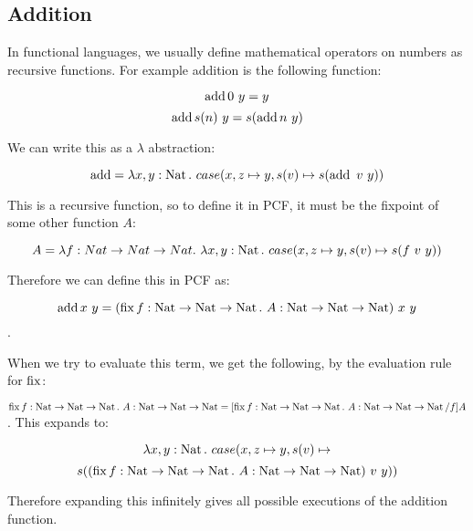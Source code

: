 \subsection{Addition}

In functional languages, we usually define mathematical operators on numbers as recursive functions. For example addition is the following function:

\[\operatorname{add}  0 \ y = y \]
\[\operatorname{add}  s(n) \ y = s(\operatorname{add}  n \ y)\]

We can write this as a $\lambda$ abstraction:

\[ \operatorname{add} = \lambda x,y : \operatorname{Nat}. \ case(x, z \mapsto y, s(v) \mapsto s(\operatorname{add} \ v \ y))\]

This is a recursive function, so to define it in PCF, it must be the fixpoint of some other function $A$:

\[ A = \lambda f: Nat \to Nat \to Nat. \ \lambda x,y : \nat. \ case(x, z \mapsto y, s(v) \mapsto s(f \ v \ y))\]

Therefore we can define this in PCF as:

\[ \operatorname{add} x \ y = (\operatorname{fix} f : \operatorname{Nat} \to \operatorname{Nat} \to \operatorname{Nat} . \ A : \operatorname{Nat} \to \operatorname{Nat} \to \operatorname{Nat}) \ x \ y  \].

When we try to evaluate this term, we get the following, by the evaluation rule for $\operatorname{fix}$:

$\operatorname{fix} f : \operatorname{Nat} \to \operatorname{Nat} \to \operatorname{Nat} . \ A : \operatorname{Nat} \to \operatorname{Nat} \to \operatorname{Nat} = [\operatorname{fix} f : \operatorname{Nat} \to \operatorname{Nat} \to \operatorname{Nat} . \ A : \operatorname{Nat} \to \operatorname{Nat} \to \operatorname{Nat}/f]A$. This expands to:

\[ \lambda x,y : \operatorname{Nat}. \ case(x, z \mapsto y, s(v) \mapsto \]
\[s((\operatorname{fix} f: \operatorname{Nat} \to \operatorname{Nat} \to \operatorname{Nat} . \ A : \operatorname{Nat} \to \operatorname{Nat} \to \operatorname{Nat}) \ v \ y)) \]

Therefore expanding this infinitely gives all possible executions of the addition function.

%

